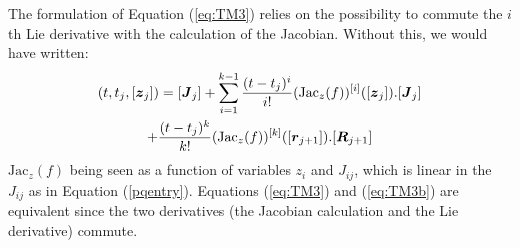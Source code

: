 \documentclass{sig-alternate-05-2015}
\newcommand\ForAuthors[1]%
 {\par\smallskip                     %
  \begin{center}%
   \fbox%
   {\parbox{0.9\linewidth}%
    {\raggedright\sc--- #1}%
   }%
  \end{center}%
  \par\smallskip                     %
 }
\newtheorem{remark}{Remark}
\begin{document}
The formulation of Equation (\ref{eq:TM3}) 
relies on the possibility to commute the $i$th Lie derivative
with the calculation of the Jacobian. Without this, we would have written:
\begin{multline}
[\J](t,t_j,[{\z}_j]) = [{\J}_j] + \sum\limits_{i=1}^{k-1} \frac{(t-t_j)^i}{i !} (\mbox{Jac}_z(f))^{[i]}([{\z}_{j}]).[{\J}_j] \\ +  \frac{(t-t_j)^k}{k !} (\mbox{Jac}_z(f))^{[k]}([{\r}_{j+1}]).[\bfm{R}_{j+1}]
\label{eq:TM3b}
\end{multline}
\noindent $\mbox{Jac}_z(f)$ being seen as a function of variables $z_i$ and $J_{ij}$, which 
is linear in the $J_{ij}$ as in Equation (\ref{pqentry}). 
Equations (\ref{eq:TM3}) and (\ref{eq:TM3b}) are equivalent since the two derivatives (the Jacobian calculation
and the Lie derivative) commute.  
\end{document}
